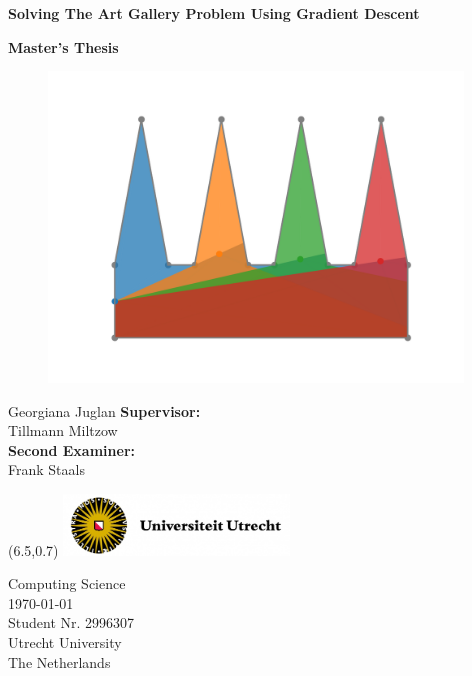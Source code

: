 \documentclass{article}
\begin{document}

\thispagestyle{empty} 
\begin{center}
    \vspace*{0.5cm}
    \huge
    \textbf{Solving The Art Gallery Problem Using Gradient Descent}

    \vspace*{0.4cm}
    \LARGE
    \textbf{Master's Thesis}
    \vspace*{2cm}

    \begin{figure}[H]
        \centering   
        \includegraphics[width = 11cm]{comb_title.png}
    \end{figure}


    \vspace{-1cm}
    \LARGE
    Georgiana Juglan
    \vfill 
    \large    
    \textbf{Supervisor:} \\
    Tillmann Miltzow \\
    \textbf{Second Examiner:} \\
    Frank Staals \\
     
\end{center}
   

\begin{textblock}{3}(6.5,0.7)
\includegraphics[width = 6cm]{Figures/UU logo.png}
\end{textblock}

\begin{flushleft}
    \vspace{0.5cm}
    Computing Science\\
    \today\\
    Student Nr. 2996307 \\
    Utrecht University\\
    The Netherlands
\end{flushleft}
\end{document}
